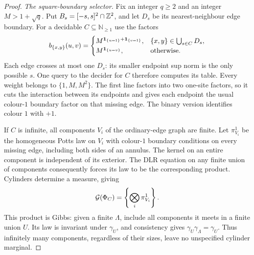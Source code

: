 \begin{proof}
\emph{The square-boundary selector.}
Fix an integer $q\ge2$ and an integer $M>1+\sqrt q$. Put
$B_s=[-s,s]^2\cap\mathbb Z^2$, and let $D_s$ be its nearest-neighbour edge boundary.
For a decidable $C\subseteq\mathbb N_{\ge1}$ use the factors
\begin{equation}\label{eq:selector-weights}
 b_{\{x,y\}}(u,v)=
 \begin{cases}
 M^{\mathbf 1_{\{u=1\}}+\mathbf 1_{\{v=1\}}},&\{x,y\}\in\bigcup_{s\in C}D_s,\\
 M^{\mathbf 1_{\{u=v\}}},&\text{otherwise}.
 \end{cases}
\end{equation}
Each edge crosses at most one $D_s$: its smaller endpoint sup norm is the
only possible $s$. One query to the decider for $C$ therefore computes its
table. Every weight belongs to $\{1,M,M^2\}$. The first line factors into
two one-site factors, so it cuts the interaction between its endpoints and
gives each endpoint the usual colour-$1$ boundary factor on that missing edge.
The binary version identifies colour $1$ with $+1$.

If $C$ is infinite, all components $V_i$ of the ordinary-edge graph are finite.
Let $\pi_{V_i}^1$ be the homogeneous Potts law on $V_i$ with colour-$1$
boundary conditions on every missing edge, including both sides of an annulus.
The kernel on an entire component is independent of its exterior. The DLR
equation on any finite union of components consequently forces its law to be
the corresponding product. Cylinders determine a measure, giving
\begin{equation}\label{eq:selector-product}
 \mathcal G(\Phi_C)=\left\{\bigotimes_i\pi_{V_i}^1\right\}.
\end{equation}
This product is Gibbs: given a finite $\Lambda$, include all components it
meets in a finite union $U$. Its law is invariant under $\gamma_U$, and
consistency gives $\gamma_U\gamma_\Lambda=\gamma_U$.
Thus infinitely many components, regardless of their sizes, leave no
unspecified cylinder marginal.


\end{proof}
